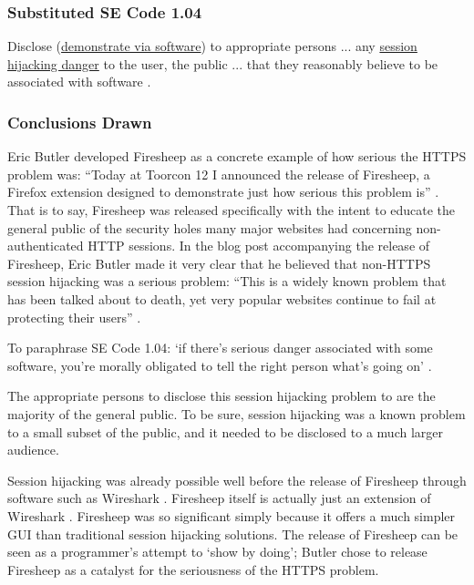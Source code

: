 \documentclass[11pt]{article}
\begin{document}
\begin{multicols}{2}
\subsubsection{Substituted SE Code 1.04}
Disclose (\uline{demonstrate via software}) to appropriate persons ... any \uline{session hijacking danger} to the user, the public ... that they reasonably believe to be associated with software \cite{se-code}. 

\subsubsection*{Conclusions Drawn}


Eric Butler developed Firesheep as a concrete example of how serious the HTTPS problem was: ``Today at Toorcon 12 I announced the release of Firesheep, a Firefox extension designed to demonstrate just how serious this problem is'' \cite{eric-butler}. That is to say, Firesheep was released specifically with the intent to educate the general public of the security holes many major websites had concerning non-authenticated HTTP sessions. In the blog post accompanying the release of Firesheep, Eric Butler made it very clear that he believed that non-HTTPS session hijacking was a serious problem: ``This is a widely known problem that has been talked about to death, yet very popular websites continue to fail at protecting their users'' \cite{eric-butler}.


To paraphrase SE Code 1.04: `if there's serious danger associated with some software, you're morally obligated to tell the right person what's going on' \cite{se-code}. 

The appropriate persons to disclose this session hijacking problem to are the majority of the general public. To be sure, session hijacking was a known problem to a small subset of the public, and it needed to be disclosed to a much larger audience.

Session hijacking was already possible well before the release of Firesheep through software such as Wireshark \cite{wireshark}. Firesheep itself is actually just an extension of Wireshark \cite{firesheep-source}. Firesheep was so significant simply because it offers a much simpler GUI than traditional session hijacking solutions. %
The release of Firesheep can be seen as a programmer's attempt to `show by doing'; Butler chose to release Firesheep as a catalyst for the seriousness of the HTTPS problem. 


\end{multicols}
\end{document}
